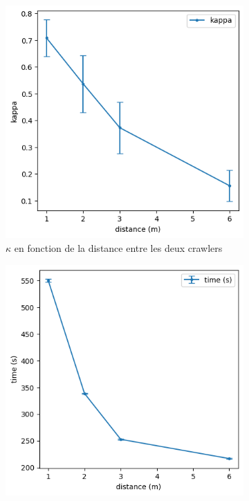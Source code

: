 \documentclass[english,RandD]{rapportPFE}  %
\begin{document}
			\begin{figure}[h!]
				\begin{subfigure}[t]{0.49\linewidth}
					\includegraphics[width=\linewidth]{graphics/peinture_au_rouleau-kappa_vs_distance.png}
					\caption{$\kappa$ en fonction de la distance entre les deux crawlers}
					\label{fig:peinture_au_rouleau-kappa_vs_distance}
				\end{subfigure}
				\hfill
				\begin{subfigure}[t]{0.49\linewidth}
						\includegraphics[width=\linewidth]{graphics/peinture_au_rouleau-time_vs_distance.png}

\end{subfigure}
\end{figure}
\end{document}
